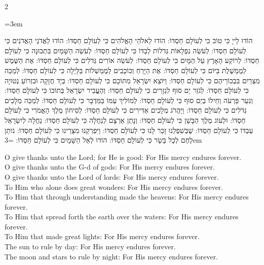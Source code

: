 \documentclass[11pt, openany]{book}
\newenvironment{bilingual}{%
  \par\vspace{4pt}%
  \begin{paracol}{2}%
}{%
  \end{paracol}%
  \par\vspace{2pt}%
}
\newenvironment{hebrewcol}{%
  \switchcolumn[1]%
  \begingroup
  \RTL
  \hebrewfont\large
  \setstretch{1.4}%
  \emergencystretch=3em
  \tolerance=9999
  \parindent=0pt\relax
}{%
  \endRTL
  \endgroup
}
\newenvironment{englishcol}{%
  \switchcolumn[0]%
  \begingroup
  \setstretch{1.4}%
  \emergencystretch=3em
  \tolerance=9999
  \normalsize
  \rightskip=0.12in\relax
}{%
  \endgroup
}
\begin{document}
\begin{bilingual}
\begin{hebrewcol}
הוֹדוּ לַייָ כִּי טוֹב		כִּי לְעוֹלָם חַסְדּוֹ:
הוֹדוּ לֵאלֹהֵי הָאֱלֹהִים	כִּי לְעוֹלָם חַסְדּוֹ:
הוֹדוּ לַאֲדֹנֵי הָאֲדֹנִים	כִּי לְעוֹלָם חַסְדּוֹ:
לְעֹשֵׂה נִפְלָאוֹת גְּדֹלוֹת לְבַדּוֹ כִּי לְעוֹלָם חַסְדּוֹ:
לְעֹשֵׂה הַשָּׁמַיִם בִּתְבוּנָה	כִּי לְעוֹלָם חַסְדּוֹ:
לְרוֹקַע הָאָרֶץ עַל הַמָּיִם	כִּי לְעוֹלָם חַסְדּוֹ:
לְעֹשֵׂה אוֹרִים גְּדֹלִים	כִּי לְעוֹלָם חַסְדּוֹ:
אֶת הַשֶּׁמֶשׁ לְמֶמְשֶׁלֶת בַּיּוֹם כִּי לְעוֹלָם חַסְדּוֹ:
אֶת הַיָּרֵחַ וְכוֹכָבִים לְמֶמְשְׁלוֹת בַּלָּיְלָה			כִּי לְעוֹלָם חַסְדּוֹ:
לְמַכֵּה מִצְרַיִם בִּבְכוֹרֵיהֶם כִּי לְעוֹלָם חַסְדּוֹ:
וַיּוֹצֵא יִשְׂרָאֵל מִתּוֹכָם	כִּי לְעוֹלָם חַסְדּוֹ:
בְּיָד חֲזָקָה וּבִזְרוֹעַ נְטוּיָה	כִּי לְעוֹלָם חַסְדּוֹ:
לְגֹזֵר יַם סוּף לִגְזָרִים	כִּי לְעוֹלָם חַסְדּוֹ:
וְהֶעֱבִיר יִשְׂרָאֵל בְּתוֹכוֹ	כִּי לְעוֹלָם חַסְדּוֹ:
וְנִעֵר פַּרְעֹה וְחֵילוֹ בְיַם סוּף כִּי לְעוֹלָם חַסְדּוֹ:
לְמוֹלִיךְ עַמּוֹ בַּמִּדְבָּר	כִּי לְעוֹלָם חַסְדּוֹ:
לְמַכֵּה מְלָכִים גְּדֹלִים	כִּי לְעוֹלָם חַסְדּוֹ:
וַיַּהֲרֹג מְלָכִים אַדִּירִים	כִּי לְעוֹלָם חַסְדּוֹ:
לְסִיחוֹן מֶלֶךְ הָאֱמֹרִי	כִּי לְעוֹלָם חַסְדּוֹ:
וּלְעוֹג מֶלֶךְ הַבָּשָׁן	כִּי לְעוֹלָם חַסְדּוֹ:
וְנָתַן אַרְצָם לְנַחֲלָה	כִּי לְעוֹלָם חַסְדּוֹ:
נַחֲלָה לְיִשְׂרָאֵל עַבְדּוֹ	כִּי לְעוֹלָם חַסְדּוֹ:
שֶׁבְּשִׁפְלֵנוּ זָכַר לָנוּ	כִּי לְעוֹלָם חַסְדּוֹ:
וַיִּפְרְקֵנוּ מִצָּרֵינוּ		כִּי לְעוֹלָם חַסְדּוֹ:
נֹותֵן לֶחֶם לְכָל בָּשָׂר	כִּי לְעוֹלָם חַסְדּוֹ:
הוֹדוּ לְאֵל הַשָּׁמָיִם	כִּי לְעוֹלָם חַסְדּוֹ:
\end{hebrewcol}
\begin{englishcol}
O give thanks unto the Lord; for He is good: For His mercy endures forever.\\[2pt]
O give thanks unto the G-d of gods: For His mercy endures forever.\\[2pt]
O give thanks unto the Lord of lords: For His mercy endures forever.\\[2pt]
To Him who alone does great wonders: For His mercy endures forever.\\[2pt]
To Him that through understanding made the heavens: For His mercy endures forever.\\[2pt]
To Him that spread forth the earth over the waters: For His mercy endures forever.\\[2pt]
To Him that made great lights: For His mercy endures forever.\\[2pt]
The sun to rule by day: For His mercy endures forever.\\[2pt]
The moon and stars to rule by night: For His mercy endures forever.\\[2pt]

\end{englishcol}
\end{bilingual}
\end{document}
